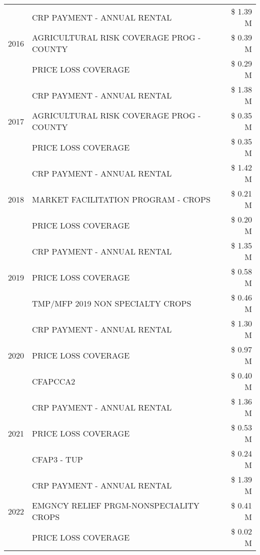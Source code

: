 \begin{tabular}{llr}
\cline{1-3}
\multirow[t]{3}{*}{2016} & CRP PAYMENT - ANNUAL RENTAL & \$ 1.39 M \\
 & AGRICULTURAL RISK COVERAGE PROG - COUNTY & \$ 0.39 M \\
 & PRICE LOSS COVERAGE & \$ 0.29 M \\
\cline{1-3}
\multirow[t]{3}{*}{2017} & CRP PAYMENT - ANNUAL RENTAL & \$ 1.38 M \\
 & AGRICULTURAL RISK COVERAGE PROG - COUNTY & \$ 0.35 M \\
 & PRICE LOSS COVERAGE & \$ 0.35 M \\
\cline{1-3}
\multirow[t]{3}{*}{2018} & CRP PAYMENT - ANNUAL RENTAL & \$ 1.42 M \\
 & MARKET FACILITATION PROGRAM - CROPS & \$ 0.21 M \\
 & PRICE LOSS COVERAGE & \$ 0.20 M \\
\cline{1-3}
\multirow[t]{3}{*}{2019} & CRP PAYMENT - ANNUAL RENTAL & \$ 1.35 M \\
 & PRICE LOSS COVERAGE & \$ 0.58 M \\
 & TMP/MFP 2019 NON SPECIALTY CROPS & \$ 0.46 M \\
\cline{1-3}
\multirow[t]{3}{*}{2020} & CRP PAYMENT - ANNUAL RENTAL & \$ 1.30 M \\
 & PRICE LOSS COVERAGE & \$ 0.97 M \\
 & CFAPCCA2 & \$ 0.40 M \\
\cline{1-3}
\multirow[t]{3}{*}{2021} & CRP PAYMENT - ANNUAL RENTAL & \$ 1.36 M \\
 & PRICE LOSS COVERAGE & \$ 0.53 M \\
 & CFAP3 - TUP & \$ 0.24 M \\
\cline{1-3}
\multirow[t]{3}{*}{2022} & CRP PAYMENT - ANNUAL RENTAL & \$ 1.39 M \\
 & EMGNCY RELIEF PRGM-NONSPECIALITY CROPS & \$ 0.41 M \\
 & PRICE LOSS COVERAGE & \$ 0.02 M \\
\cline{1-3}
\bottomrule
\end{tabular}

